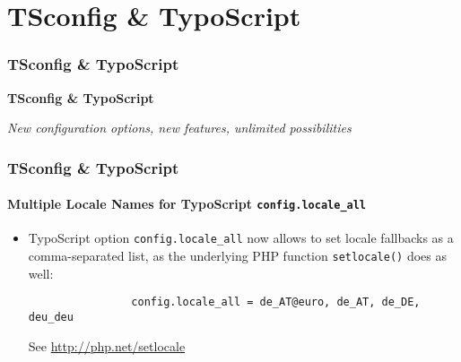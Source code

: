 %

\section{TSconfig \& TypoScript}
\begin{frame}[fragile]
	\frametitle{TSconfig \& TypoScript}

	\begin{center}\huge{\color{typo3darkgrey}\textbf{TSconfig \& TypoScript}}\end{center}
	\begin{center}\large{\textit{New configuration options, new features, unlimited possibilities}}\end{center}

\end{frame}

\begin{frame}[fragile]
	\frametitle{TSconfig \& TypoScript}
	\framesubtitle{Multiple Locale Names for TypoScript \texttt{config.locale\_all}}

	\lstset{basicstyle=\small\ttfamily}

	\begin{itemize}

		\item TypoScript option \texttt{config.locale\_all} now allows to
			set locale fallbacks as a comma-separated list, as the underlying
			PHP function \texttt{setlocale()} does as well:

			\begin{lstlisting}
				config.locale_all = de_AT@euro, de_AT, de_DE, deu_deu
			\end{lstlisting}

			See \url{http://php.net/setlocale}

	\end{itemize}

\end{frame}

